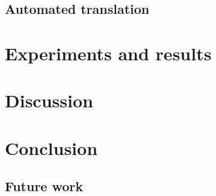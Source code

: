 \documentclass[a4paper]{report}
\begin{document}
\section{Automated translation}


\chapter{Experiments and results}
\chapter{Discussion}

\chapter{Conclusion}
\section{Future work}

\newpage


\end{document}
